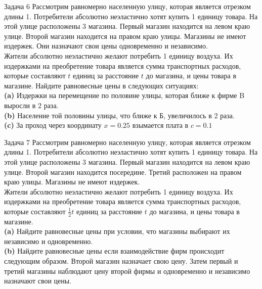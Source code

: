 \begin{mybox}{Задача 6}
    \indent\setlength{\parindent}{1em}\indent\setlength{\parindent}{1em}Рассмотрим равномерно населенную улицу, которая
    является отрезком длины 1. Потребители абсолютно неэластично хотят купить 1 единицу товара. На этой улице
    расположены 3 магазина. Первый магазин находится на левом краю улице. Второй магазин находится на правом краю улицы.
    Магазины не имеют издержек. Они назначают свои цены одновременно и независимо.\\
    \indent\setlength{\parindent}{1em}Жители абсолютно неэластично желают потребить 1 единицу воздуха. Их издержками на
    преобретение товара является сумма транспортных расходов, которые составляют $t$ единиц за расстояние $t$
    до магазина, и цены товара в магазине. Найдите равновесные цены в следующих ситуациях:\smallskip\\
    \smallskip\indent\setlength{\parindent}{1em}\textbf{(a)} Издержки на перемещение по половине улицы, которая ближе к
    фирме B выросли в 2 раза.\smallskip\\
    \indent\setlength{\parindent}{1em}\textbf{(b)} Население той половины улицы, что ближе к Б, увеличилось в 2 раза.\smallskip\\
    \indent\setlength{\parindent}{1em}\textbf{(c)} За проход через координату $x=0.25$ взымается плата в $c=0.1$
\end{mybox}

\begin{mybox}{Задача 7}
    \indent\setlength{\parindent}{1em}\indent\setlength{\parindent}{1em}Рассмотрим равномерно населенную улицу, которая
    является отрезком длины 1. Потребители абсолютно неэластично хотят купить 1 единицу товара. На этой улице
    расположены 3 магазина. Первый магазин находится на левом краю улице. Второй магазин находится посередине. Третий
    расположен на правом краю улицы. Магазины не имеют издержек.\\
    \indent\setlength{\parindent}{1em}Жители абсолютно неэластично желают потребить 1 единицу воздуха. Их издержками на
    преобретение товара является сумма транспортных расходов, которые составляют $\frac{1}{2}t$ единиц за расстояние $t$
    до магазина, и цены товара в магазине.\smallskip\\
    \indent\setlength{\parindent}{1em}\textbf{(a)} Найдите равновесные цены при условии, что магазины выбирают их
    независимо и
    одновременно.\smallskip\\
    \indent\setlength{\parindent}{1em}\textbf{(b)} Найдите равновесные цены если взаимодействие фирм происходит
    следующим образом. Второй магазин назначает свою цену. Затем первый и третий магазины наблюдают цену второй фирмы и
    одновременно и независимо назначают свои цены.
\end{mybox}

